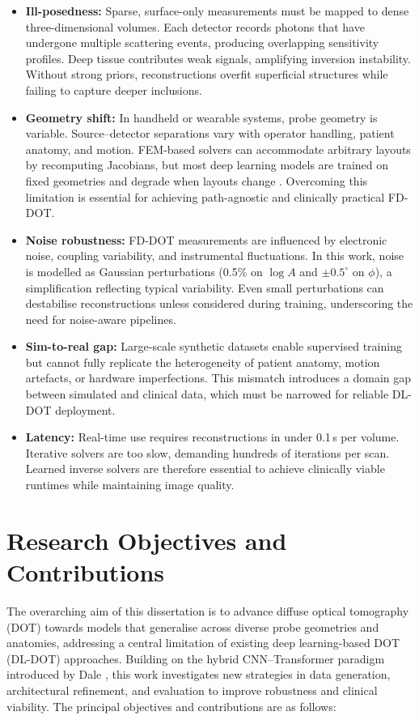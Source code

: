 \begin{itemize}
    \item \textbf{Ill-posedness:} Sparse, surface-only measurements must be mapped to dense three-dimensional volumes. Each detector records photons that have undergone multiple scattering events, producing overlapping sensitivity profiles. Deep tissue contributes weak signals, amplifying inversion instability. Without strong priors, reconstructions overfit superficial structures while failing to capture deeper inclusions.
    
    \item \textbf{Geometry shift:} In handheld or wearable systems, probe geometry is variable. Source–detector separations vary with operator handling, patient anatomy, and motion. FEM-based solvers can accommodate arbitrary layouts by recomputing Jacobians, but most deep learning models are trained on fixed geometries and degrade when layouts change \cite{dale2025}. Overcoming this limitation is essential for achieving path-agnostic and clinically practical FD-DOT.
    
    \item \textbf{Noise robustness:} FD-DOT measurements are influenced by electronic noise, coupling variability, and instrumental fluctuations. In this work, noise is modelled as Gaussian perturbations (0.5\% on $\log A$ and $\pm 0.5^\circ$ on $\phi$), a simplification reflecting typical variability. Even small perturbations can destabilise reconstructions unless considered during training, underscoring the need for noise-aware pipelines.
    
    \item \textbf{Sim-to-real gap:} Large-scale synthetic datasets enable supervised training but cannot fully replicate the heterogeneity of patient anatomy, motion artefacts, or hardware imperfections. This mismatch introduces a domain gap between simulated and clinical data, which must be narrowed for reliable DL-DOT deployment.
    
    \item \textbf{Latency:} Real-time use requires reconstructions in under 0.1\,s per volume. Iterative solvers are too slow, demanding hundreds of iterations per scan. Learned inverse solvers are therefore essential to achieve clinically viable runtimes while maintaining image quality.
\end{itemize}

\section{Research Objectives and Contributions}
The overarching aim of this dissertation is to advance diffuse optical tomography (DOT) towards models that generalise across diverse probe geometries and anatomies, addressing a central limitation of existing deep learning-based DOT (DL-DOT) approaches. Building on the hybrid CNN–Transformer paradigm introduced by Dale \cite{dale2024, dale2025}, this work investigates new strategies in data generation, architectural refinement, and evaluation to improve robustness and clinical viability. The principal objectives and contributions are as follows:

